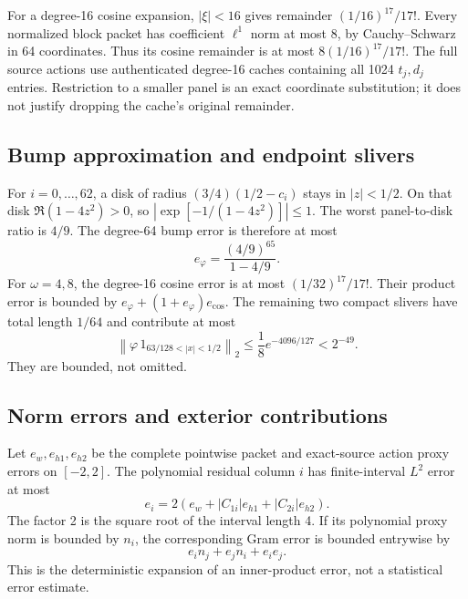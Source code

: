 \documentclass[11pt,a4paper]{article}
\numberwithin{equation}{section}
\theoremstyle{definition}\newtheorem{definition}[theorem]{Definition}
\theoremstyle{remark}\newtheorem{remark}[theorem]{Remark}
\newcommand{\norm}[1]{\left\|#1\right\|}
\begin{document}
For a degree-16 cosine expansion, $|\xi|<16$ gives remainder
$(1/16)^{17}/17!$. Every normalized block packet has coefficient $\ell^1$ norm at most 8, by Cauchy--Schwarz in 64 coordinates. Thus its cosine remainder is at most $8(1/16)^{17}/17!$. The full source actions use authenticated degree-16 caches containing all 1024 $t_j,d_j$ entries. Restriction to a smaller panel is an exact coordinate substitution; it does not justify dropping the cache's original remainder.

\subsection{Bump approximation and endpoint slivers}
For $i=0,\ldots,62$, a disk of radius $(3/4)(1/2-c_i)$ stays in $|z|<1/2$. On that disk $\Re(1-4z^2)>0$, so $|\exp[-1/(1-4z^2)]|\le1$. The worst panel-to-disk ratio is $4/9$. The degree-64 bump error is therefore at most
\begin{equation}
 e_\varphi=\frac{(4/9)^{65}}{1-4/9}.
\end{equation}
For $\omega=4,8$, the degree-16 cosine error is at most $(1/32)^{17}/17!$. Their product error is bounded by $e_\varphi+(1+e_\varphi)e_{\cos}$. The remaining two compact slivers have total length $1/64$ and contribute at most
\begin{equation}\label{eq:sliver}
 \norm{\varphi\,1_{63/128<|x|<1/2}}_2
 \le\frac18e^{-4096/127}<2^{-49}.
\end{equation}
They are bounded, not omitted.

\subsection{Norm errors and exterior contributions}
Let $e_w,e_{h1},e_{h2}$ be the complete pointwise packet and exact-source action proxy errors on $[-2,2]$. The polynomial residual column $i$ has finite-interval $L^2$ error at most
\begin{equation}
 e_i=2(e_w+|C_{1i}|e_{h1}+|C_{2i}|e_{h2}).
\end{equation}
The factor 2 is the square root of the interval length 4. If its polynomial proxy norm is bounded by $n_i$, the corresponding Gram error is bounded entrywise by
\begin{equation}\label{eq:Gramerror}
 e_in_j+e_jn_i+e_ie_j.
\end{equation}
This is the deterministic expansion of an inner-product error, not a statistical error estimate.
\end{document}
